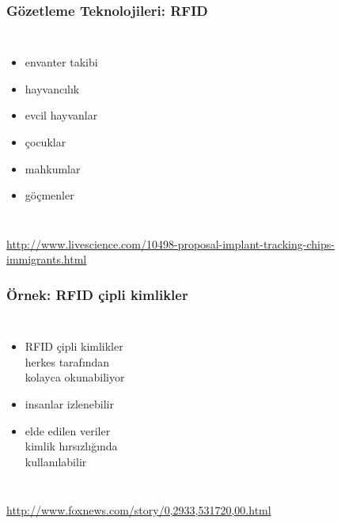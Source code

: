 \documentclass[dvipsnames]{beamer}
\theoremstyle{plain}
\begin{document}
\begin{frame}
  \frametitle{Gözetleme Teknolojileri: RFID}

  \begin{columns}
    \begin{itemize}
      \item envanter takibi
      \item hayvancılık

      \pause
      \medskip
      \item evcil hayvanlar
      \item çocuklar
      \item mahkumlar
      \item göçmenler
    \end{itemize}

  \end{columns}

  \medskip
  \tiny{\url{http://www.livescience.com/10498-proposal-implant-tracking-chips-immigrants.html}}\\
\end{frame}

\begin{frame}
  \frametitle{Örnek: RFID çipli kimlikler}

  \begin{columns}

    \begin{itemize}
      \item RFID çipli kimlikler\\
        herkes tarafından\\
        kolayca okunabiliyor
      \item insanlar izlenebilir
      \item elde edilen veriler\\
        kimlik hırsızlığında\\
        kullanılabilir
    \end{itemize}
  \end{columns}

  \medskip
  \tiny{\url{http://www.foxnews.com/story/0,2933,531720,00.html}}\\
\end{frame}
\end{document}
